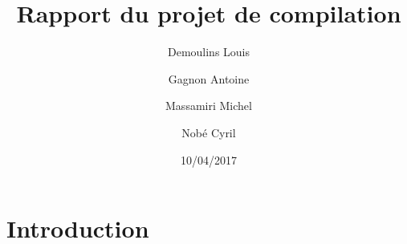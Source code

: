 \documentclass{article}
\title{Rapport du projet de compilation}
\date{10/04/2017}
\author{Demoulins Louis \and Gagnon Antoine \and Massamiri Michel \and Nobé Cyril}
\begin{document}
\maketitle


\newpage
\section{Introduction}
\newpage
\end{document}

